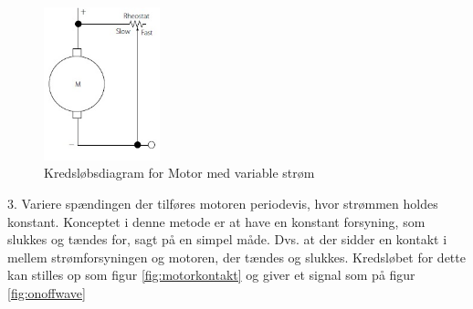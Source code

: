 \begin{figure}[H]
	\centering
	\includegraphics[width=0.3\textwidth]{billeder/Hardware/motorcurrent.jpg}
	\caption{Kredsløbsdiagram for Motor med variable strøm}
	\label{fig:motorcurrent}
\end{figure}

3. Variere spændingen der tilføres motoren periodevis, hvor strømmen holdes konstant.
Konceptet i denne metode er at have en konstant forsyning, som slukkes og tændes for, sagt på en simpel måde. Dvs. at der sidder en kontakt i mellem strømforsyningen og motoren, der tændes og slukkes. Kredsløbet for dette kan stilles op som figur \ref{fig:motorkontakt} og giver et signal som på figur \ref{fig:onoffwave}

